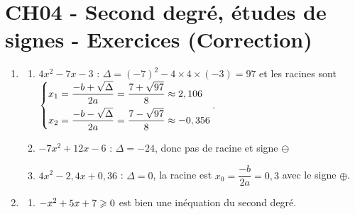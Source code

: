 \documentclass[a4paper,11pt]{article}
\author{Pierquet}
\title{\nomfichier}
\begin{document}
\pagestyle{fancy}

\part{CH04 - Second degré, études de signes - Exercices (Correction)}

\smallskip

%
\begin{enumerate}
	\item 
	\begin{enumerate}
		\item $4x^2-7x-3$ : $\Delta=(-7)^2-4\times4\times(-3)=97$ et les racines sont $\begin{dcases} x_1 = \frac{-b+\sqrt{\Delta}}{2a}=\frac{7+\sqrt{97}}{8} \approx 2,106 \\ x_2 = \frac{-b-\sqrt{\Delta}}{2a}=\frac{7-\sqrt{97}}{8} \approx -0,356 \end{dcases}$.
		
		\begin{center}
		\end{center}
		\item $-7x^2+12x-6$ : $\Delta=-24$, donc pas de racine et signe $\ominus$
		
		\begin{center}
		\end{center}
		\item $4x^2-2,4x+0,36$ : $\Delta=0$, la racine est $x_0=\dfrac{-b}{2a}=0,3$ avec le signe $\oplus$.
		
		\begin{center}
		\end{center}
	\end{enumerate}
	\item 
	\begin{enumerate}
		\item $-x^2+5x+7 \geqslant 0$ est bien une inéquation du second degré.
		

\end{enumerate}
\end{enumerate}
\end{document}
